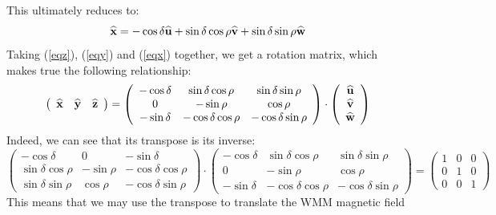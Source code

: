 \documentclass{article}
\newcommand{\tmstrong}[1]{\textbf{#1}}
\begin{document}
This ultimately reduces to:
\begin{equation}
  \widehat{\text{{\tmstrong{x}}}} = - \cos \delta
  \text{$\widehat{\text{{\tmstrong{u}}}}$} + \sin \delta \cos \rho
  \text{$\widehat{\text{{\tmstrong{v}}}}$} + \sin \delta \sin \rho
  \text{$\widehat{\text{{\tmstrong{w}}}}$} \label{eqx}
\end{equation}
Taking (\ref{eqz}), (\ref{eqy}) and (\ref{eqx}) together, we get a rotation
matrix, which makes true the following relationship:
\[ \left(\begin{array}{ccc}
     \widehat{\text{{\tmstrong{x}}}} & \widehat{\text{{\tmstrong{y}}}} &
     \widehat{\text{{\tmstrong{z}}}}
   \end{array}\right) = \left(\begin{array}{ccc}
     - \cos \delta & \sin \delta \cos \rho & \sin \delta \sin \rho\\
     0 & - \sin \rho & \cos \rho\\
     - \sin \delta & - \cos \delta \cos \rho & - \cos \delta \sin \rho
   \end{array}\right) \cdot \left(\begin{array}{c}
     \text{$\widehat{\text{{\tmstrong{u}}}}$}\\
     \text{$\widehat{\text{{\tmstrong{v}}}}$}\\
     \text{$\widehat{\text{{\tmstrong{w}}}}$}
   \end{array}\right) \]
Indeed, we can see that its transpose is its inverse:
\[ \left(\begin{array}{ccc}
     - \cos \delta & 0 & - \sin \delta\\
     \sin \delta \cos \rho & - \sin \rho & - \cos \delta \cos \rho\\
     \sin \delta \sin \rho & \cos \rho & - \cos \delta \sin \rho
   \end{array}\right) \cdot \left(\begin{array}{ccc}
     - \cos \delta & \sin \delta \cos \rho & \sin \delta \sin \rho\\
     0 & - \sin \rho & \cos \rho\\
     - \sin \delta & - \cos \delta \cos \rho & - \cos \delta \sin \rho
   \end{array}\right) = \left(\begin{array}{ccc}
     1 & 0 & 0\\
     0 & 1 & 0\\
     0 & 0 & 1
   \end{array}\right) \]
This means that we may use the transpose to translate the WMM magnetic field
\end{document}
